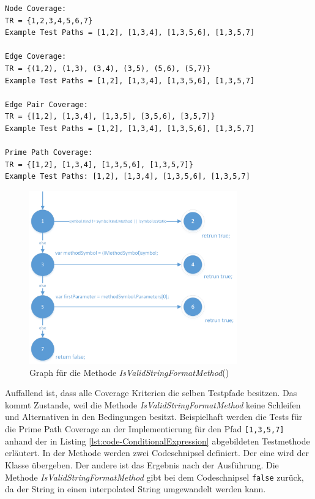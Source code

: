 \begin{lstlisting}[caption={Coverage für die Mehtode \textit{IsValidStringFormatMethod}},
label=lst:coverage-IsValidStringFormatMethod]
Node Coverage:
TR = {1,2,3,4,5,6,7}
Example Test Paths = [1,2], [1,3,4], [1,3,5,6], [1,3,5,7]

Edge Coverage:
TR = {(1,2), (1,3), (3,4), (3,5), (5,6), (5,7)}
Example Test Paths = [1,2], [1,3,4], [1,3,5,6], [1,3,5,7]

Edge Pair Coverage:
TR = {[1,2], [1,3,4], [1,3,5], [3,5,6], [3,5,7]}
Example Test Paths = [1,2], [1,3,4], [1,3,5,6], [1,3,5,7]

Prime Path Coverage:
TR = {[1,2], [1,3,4], [1,3,5,6], [1,3,5,7]}
Example Test Paths: [1,2], [1,3,4], [1,3,5,6], [1,3,5,7]
\end{lstlisting}
\begin{figure}[h]
	\centering
	\includegraphics[width=0.8\textwidth]{images/GraphISValidStringFormatMethod.png}
	\caption{Graph für die Methode \textit{IsValidStringFormatMethod}()}
	\label{fig:graph-validstring}
\end{figure}
Auffallend ist, dass alle Coverage Kriterien die selben Testpfade besitzen. Das kommt Zustande, weil die Methode \textit{IsValidStringFormatMethod} keine Schleifen und Alternativen in den Bedingungen besitzt. Beispielhaft werden die Tests für die Prime Path Coverage an der Implementierung für den Pfad \texttt{[1,3,5,7]} anhand der in Listing \ref{lst:code-ConditionalExpression} abgebildeten Testmethode erläutert. In der Methode werden zwei Codeschnipsel definiert. Der eine wird der Klasse übergeben. Der andere ist das Ergebnis nach der Ausführung. Die Methode \textit{IsValidStringFormatMethod} gibt bei dem Codeschnipsel \texttt{false} zurück, da der String in einen interpolated String umgewandelt werden kann.


